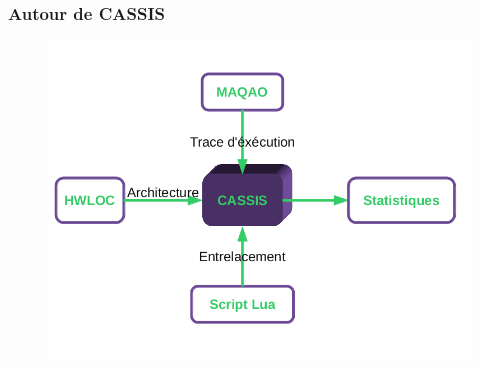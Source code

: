 \begin{frame}
  \frametitle{Autour de CASSIS}
  \begin{figure}
    \includegraphics[scale=0.4]{images/schema_cassis.png}
  \end{figure}
\end{frame}
